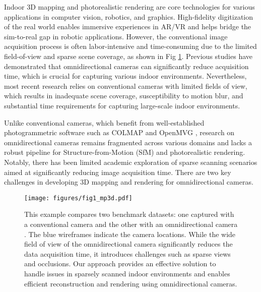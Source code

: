 

Indoor 3D mapping and photorealistic rendering are core technologies for various applications in computer vision, robotics, and graphics. High-fidelity digitization of the real world enables immersive experiences in AR/VR and helps bridge the sim-to-real gap in robotic applications. However, the conventional image acquisition process \cite{dai2017scannet,baruch2021arkitscenes,barron2022mip} is often labor-intensive and time-consuming due to the limited field-of-view and sparse scene coverage, as shown in Fig \ref{fig:introduction}. 
Previous studies \cite{janiszewski2022rapid,herban2022use} have demonstrated that omnidirectional cameras can significantly reduce acquisition time, which is crucial for capturing various indoor environments.
Nevertheless, most recent research \cite{schonberger2016structure,moulon2017openmvg,mildenhall2021nerf,kerbl20233d,waechter2014TexRecon} relies on conventional cameras with limited fields of view, which results in inadequate scene coverage, susceptibility to motion blur, and substantial time requirements for capturing large-scale indoor environments. 

Unlike conventional cameras, which benefit from well-established photogrammetric software such as COLMAP \cite{schonberger2016structure} and OpenMVG \cite{moulon2017openmvg}, research on omnidirectional cameras remains fragmented across various domains and lacks a robust pipeline for Structure-from-Motion (SfM) and photorealistic rendering. Notably, there has been limited academic exploration of sparse scanning scenarios aimed at significantly reducing image acquisition time. There are two key challenges in developing 3D mapping and rendering for omnidirectional cameras. 



\begin{figure}[t]
    \centering
    \texttt{[image: figures/fig1\_mp3d.pdf]}
    \caption{This example compares two benchmark datasets: one captured with a conventional camera \cite{dai2017scannet} and the other with an omnidirectional camera \cite{chang2017matterport3d}. The blue wireframes indicate the camera locations. While the wide field of view of the omnidirectional camera significantly reduces the data acquisition time, it introduces challenges such as sparse views and occlusions. Our approach provides an effective solution to handle issues in sparsely scanned indoor environments and enables efficient reconstruction and rendering using omnidirectional cameras.}
    \label{fig:introduction}
    \vspace*{-5mm}
\end{figure}

